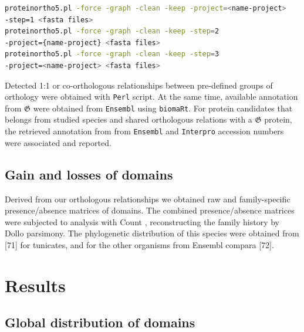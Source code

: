 \documentclass[11pt]{article}
\newcommand{\TODO}[1]{\begingroup\color{red}#1\endgroup}
\begin{document}
\begin{lstlisting}[language=bash, breaklines=true]
proteinortho5.pl -force -graph -clean -keep -project=<name-project> 
-step=1 <fasta files>
proteinortho5.pl -force -graph -clean -keep -step=2 
-project={name-project} <fasta files>
proteinortho5.pl -force -graph -clean -keep -step=3  
-project=<name-project> <fasta files>
\end{lstlisting}

Detected 1:1 or co-orthologous relationships between pre-defined groups of 
orthology were obtained with \texttt{Perl} script. At the same time, available 
annotation from $\boldsymbol{\mathfrak{G}}$ were obtained from \texttt{Ensembl} 
using \texttt{biomaRt}. For protein candidates that belongs from studied 
species and shared orthologous relations with a $\boldsymbol{\mathfrak{G}}$ 
protein, the retrieved annotation from from \texttt{Ensembl} and 
\texttt{Interpro} accession numbers were associated and reported.


\TODO{
\subsection*{Gain and losses of domains}

Derived from our orthologous relationships we obtained raw and family-specific 
presence/absence matrices of domains. The combined presence/absence matrices 
were subjected to analysis with Count \cite{csuros2010}, reconstructing the 
family history by Dollo parsimony. The phylogenetic distribution of this species 
were obtained from [71] for tunicates, and for the other organisms from Ensembl 
compara [72].
}
\section*{Results}

\subsection*{Global distribution of domains}

\end{document}
